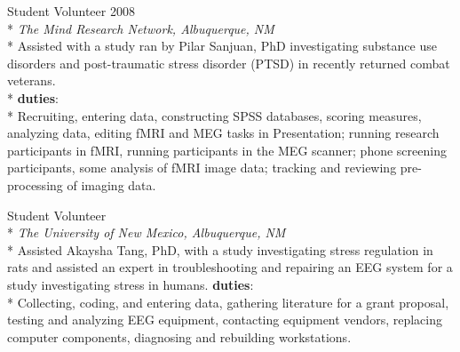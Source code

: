 \documentclass[]{friggeri-cv} %
\begin{document}
\begin{description}
  \item  {\largeheaderfont Student Volunteer } {\smallheaderfont \hfill 2008} \\*
    {\footnotesize \emph{The Mind Research Network, Albuquerque, NM}} \hfill \\*
Assisted with a study ran by Pilar Sanjuan, PhD investigating substance use disorders and
post-traumatic stress disorder (PTSD) in recently returned combat veterans. \\*
\textbf{duties}: \\*
Recruiting, entering data, constructing SPSS databases, scoring
measures, analyzing data, editing fMRI and MEG tasks in Presentation; running research
participants in fMRI, running participants in the MEG scanner; phone screening participants,
some analysis of fMRI image data; tracking and reviewing pre-processing of
imaging data.
\end{description}

\begin{description}
  \item  {\largeheaderfont Student Volunteer}  \hfill { } \\*
    {\footnotesize \emph{The University of New Mexico, Albuquerque, NM}\textemdash } \\*
Assisted Akaysha Tang, PhD, with a study investigating stress regulation in rats and assisted an
expert in troubleshooting and repairing an EEG system for a study investigating stress in
humans.
\textbf{duties}: \\*
Collecting, coding, and entering data, gathering literature for a grant
proposal, testing and analyzing EEG equipment, contacting equipment vendors, replacing
computer components, diagnosing and rebuilding workstations.
\end{description}

\end{document}
